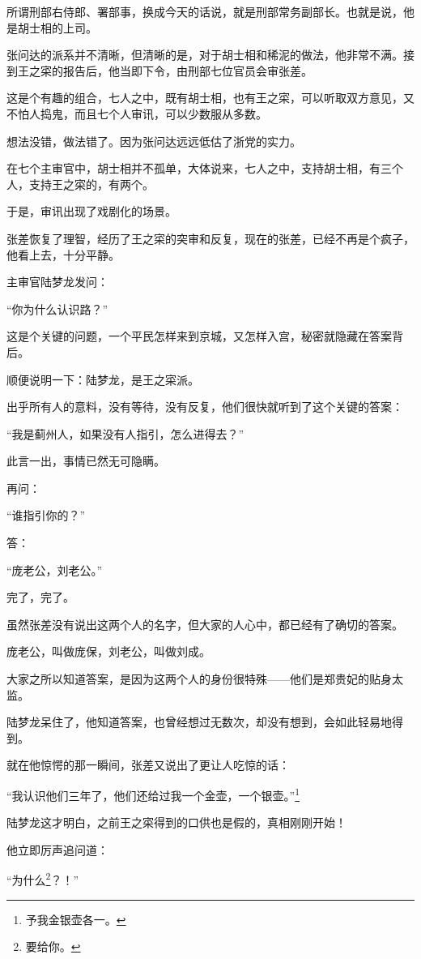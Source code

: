 \begin{multicols}{\theparacolNo}
所谓刑部右侍郎、署部事，换成今天的话说，就是刑部常务副部长。也就是说，他是胡士相的上司。

张问达的派系并不清晰，但清晰的是，对于胡士相和稀泥的做法，他非常不满。接到王之寀的报告后，他当即下令，由刑部七位官员会审张差。

这是个有趣的组合，七人之中，既有胡士相，也有王之寀，可以听取双方意见，又不怕人捣鬼，而且七个人审讯，可以少数服从多数。

想法没错，做法错了。因为张问达远远低估了浙党的实力。

在七个主审官中，胡士相并不孤单，大体说来，七人之中，支持胡士相，有三个人，支持王之寀的，有两个。

于是，审讯出现了戏剧化的场景。

张差恢复了理智，经历了王之寀的突审和反复，现在的张差，已经不再是个疯子，他看上去，十分平静。

主审官陆梦龙发问：

“你为什么认识路？”

这是个关键的问题，一个平民怎样来到京城，又怎样入宫，秘密就隐藏在答案背后。

顺便说明一下：陆梦龙，是王之寀派。

出乎所有人的意料，没有等待，没有反复，他们很快就听到了这个关键的答案：

“我是蓟州人，如果没有人指引，怎么进得去？”

此言一出，事情已然无可隐瞒。

再问：

“谁指引你的？”

答：

“庞老公，刘老公。”

完了，完了。

虽然张差没有说出这两个人的名字，但大家的人心中，都已经有了确切的答案。

庞老公，叫做庞保，刘老公，叫做刘成。

大家之所以知道答案，是因为这两个人的身份很特殊——他们是郑贵妃的贴身太监。

陆梦龙呆住了，他知道答案，也曾经想过无数次，却没有想到，会如此轻易地得到。

就在他惊愕的那一瞬间，张差又说出了更让人吃惊的话：

“我认识他们三年了，他们还给过我一个金壶，一个银壶。”\footnote{予我金银壶各一。}

陆梦龙这才明白，之前王之寀得到的口供也是假的，真相刚刚开始！

他立即厉声追问道：

“为什么\footnote{要给你。}？！”


\end{multicols}
